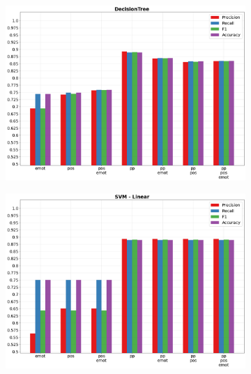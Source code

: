 \documentclass[oneside]{book}
\begin{document}
\begin{figure}[!h]
	\hspace*{-3cm}
	\begin{subfigure}[b]{0.5\textwidth}
		\centering
		\includegraphics[width=10cm]{assets/reports/macro/nobow/DecisionTree.png}
	\end{subfigure}
	\hfill
	\begin{subfigure}[b]{0.5\textwidth}		
		\centering
		\hspace*{0.15cm}
		\includegraphics[width=10cm]{assets/reports/macro/nobow/SVM - Linear.png}
	\end{subfigure}
\end{figure}
\newpage
\end{document}
